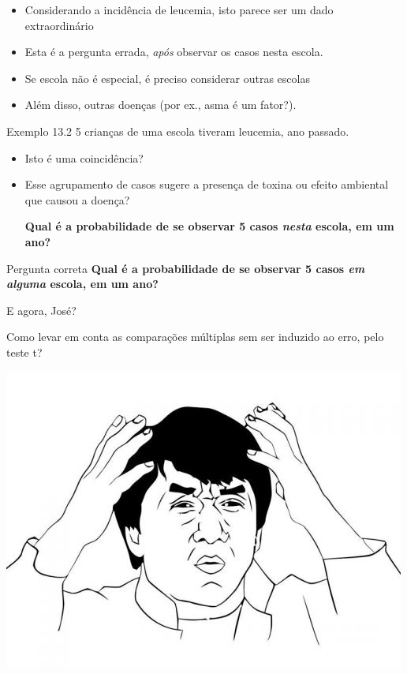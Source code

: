 \documentclass{beamer}
\begin{document}
\begin{frame}
  \begin{itemize}
  \item Considerando a incidência de leucemia, isto parece ser um dado extraordinário
  \item Esta é a pergunta errada, {\em após} observar os casos nesta escola.
  \item Se escola não é especial, é preciso considerar outras escolas
  \item Além disso, outras doenças (por ex., asma é um fator?).
  \end{itemize}

\end{frame}
\begin{frame}
  \begin{exampleblock}{Exemplo 13.2}
    5 crianças de uma escola tiveram leucemia, ano passado.

    \begin{itemize}
    \item Isto é uma coincidência?
    \item Esse agrupamento de casos sugere a presença de toxina ou efeito ambiental que causou a doença?

      \bigskip
      {\bf Qual é a probabilidade de se observar 5 casos {\em nesta} escola, em um ano?}
    \end{itemize}
  \end{exampleblock}
  \begin{exampleblock}{Pergunta correta}
    {\bf Qual é a probabilidade de se observar 5 casos {\em em alguma} escola, em um ano?}
  \end{exampleblock}
\end{frame}

\begin{frame}{E agora, José?}
  \begin{block}{}
    Como levar em conta as comparações múltiplas sem ser induzido ao erro, pelo teste t?
  \end{block}
  \bigskip
  \begin{center}
    \includegraphics[width=.4\textwidth]{Cap10-11/Jackie-Chan-WTF}
  \end{center}
\end{frame}
\end{document}
